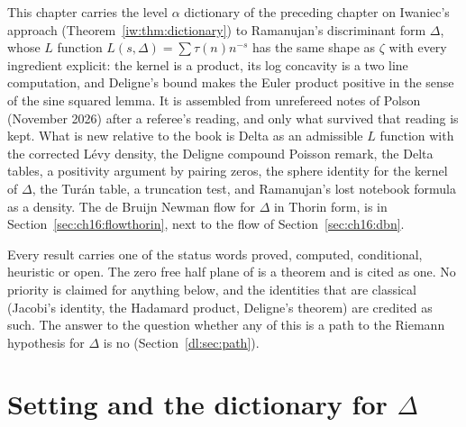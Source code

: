 
This chapter carries the level $\alpha$ dictionary of the preceding chapter on Iwaniec's approach (Theorem~\ref{iw:thm:dictionary}) to Ramanujan's discriminant form $\Delta$, whose $L$ function $L(s,\Delta)=\sum\tau(n)n^{-s}$ has the same shape as $\zeta$ with every ingredient explicit: the kernel is a product, its log concavity is a two line computation, and Deligne's bound makes the Euler product positive in the sense of the sine squared lemma. It is assembled from unrefereed notes of Polson (November 2026) after a referee's reading, and only what survived that reading is kept. What is new relative to the book is Delta as an admissible $L$ function with the corrected L\'evy density, the Deligne compound Poisson remark, the Delta tables, a positivity argument by pairing zeros, the sphere identity for the kernel of $\Delta$, the Tur\'an table, a truncation test, and Ramanujan's lost notebook formula as a density. The de Bruijn Newman flow for $\Delta$ in Thorin form, is in Section~\ref{sec:ch16:flowthorin}, next to the flow of Section~\ref{sec:ch16:dbn}.

Every result carries one of the status words proved, computed, conditional, heuristic or open. The zero free half plane of \cite{OAI26a} is a theorem and is cited as one. No priority is claimed for anything below, and the identities that are classical (Jacobi's identity, the Hadamard product, Deligne's theorem) are credited as such. The answer to the question whether any of this is a path to the Riemann hypothesis for $\Delta$ is no (Section~\ref{dl:sec:path}).

\section{Setting and the dictionary for \texorpdfstring{$\Delta$}{Delta}}\label{dl:sec:setting}

